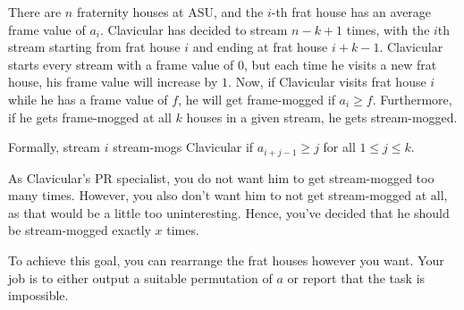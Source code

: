 There are $n$ fraternity houses at ASU, and the $i$-th frat house has an
average frame value of $a_i$.
Clavicular has decided to stream $n - k + 1$ times, with the $i$th
stream starting from frat house $i$ and ending at frat house $i + k - 1$.
Clavicular starts every stream with a frame value of $0$, but
each time he visits a new frat house, his frame value will increase by $1$.
Now, if Clavicular visits frat house
$i$ while he has a frame value of $f$, he will get frame-mogged if $a_i \geq f$.
Furthermore, if he gets frame-mogged at all $k$ houses in a given stream,
he gets stream-mogged.

Formally, stream $i$ stream-mogs Clavicular if $a_{i + j - 1} \geq j$ for all $1 \leq j \leq k$.

As Clavicular's PR specialist, you do not want him to get stream-mogged too many
times. However, you also don't want him to not get stream-mogged at all, as
that would be a little too uninteresting. Hence, you've decided that he
should be stream-mogged exactly $x$ times.

To achieve this goal, you can rearrange the frat houses however you want.
Your job is to either output a suitable permutation of $a$
or report that the task is impossible.
